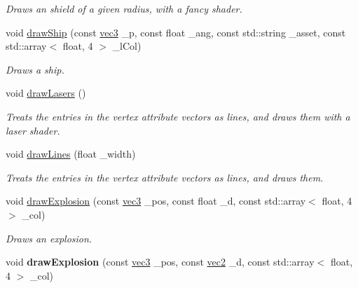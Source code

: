 \begin{DoxyCompactItemize}
\begin{DoxyCompactList}\small\item\em Draws an shield of a given radius, with a fancy shader. \end{DoxyCompactList}\item 
void \hyperlink{classrenderer__ngl_a28a8b1d91e2594ec7dcdee612ed10a2c}{draw\-Ship} (const \hyperlink{structvec3}{vec3} \-\_\-p, const float \-\_\-ang, const std\-::string \-\_\-asset, const std\-::array$<$ float, 4 $>$ \-\_\-l\-Col)
\begin{DoxyCompactList}\small\item\em Draws a ship. \end{DoxyCompactList}\item 
\hypertarget{classrenderer__ngl_a772bdcdb6d7962b8ba501c7201dbc468}{void \hyperlink{classrenderer__ngl_a772bdcdb6d7962b8ba501c7201dbc468}{draw\-Lasers} ()}\label{classrenderer__ngl_a772bdcdb6d7962b8ba501c7201dbc468}

\begin{DoxyCompactList}\small\item\em Treats the entries in the vertex attribute vectors as lines, and draws them with a laser shader. \end{DoxyCompactList}\item 
void \hyperlink{classrenderer__ngl_a6608a08333dad313c0c04e861609e893}{draw\-Lines} (float \-\_\-width)
\begin{DoxyCompactList}\small\item\em Treats the entries in the vertex attribute vectors as lines, and draws them. \end{DoxyCompactList}\item 
void \hyperlink{classrenderer__ngl_ae180513edc9d7af4ce8bf178cd2158c2}{draw\-Explosion} (const \hyperlink{structvec3}{vec3} \-\_\-pos, const float \-\_\-d, const std\-::array$<$ float, 4 $>$ \-\_\-col)
\begin{DoxyCompactList}\small\item\em Draws an explosion. \end{DoxyCompactList}\item 
\hypertarget{classrenderer__ngl_a4d2b812e4c18a52020b53971f22adf52}{void {\bfseries draw\-Explosion} (const \hyperlink{structvec3}{vec3} \-\_\-pos, const \hyperlink{structvec2}{vec2} \-\_\-d, const std\-::array$<$ float, 4 $>$ \-\_\-col)}\label{classrenderer__ngl_a4d2b812e4c18a52020b53971f22adf52}


\end{DoxyCompactItemize}
